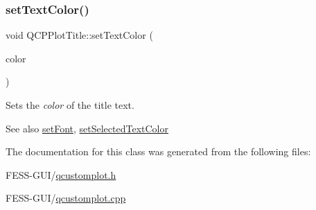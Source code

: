 \subsubsection{\texorpdfstring{set\+Text\+Color()}{setTextColor()}}
{\footnotesize\ttfamily void Q\+C\+P\+Plot\+Title\+::set\+Text\+Color (\begin{DoxyParamCaption}\item[{const Q\+Color \&}]{color }\end{DoxyParamCaption})}

Sets the {\itshape color} of the title text.

\begin{DoxySeeAlso}{See also}
\hyperlink{class_q_c_p_plot_title_a199fc7170802ea65006c371875349e37}{set\+Font}, \hyperlink{class_q_c_p_plot_title_a09ffd8c52ac8824d00382f84be391b66}{set\+Selected\+Text\+Color} 
\end{DoxySeeAlso}


The documentation for this class was generated from the following files\+:\begin{DoxyCompactItemize}
\item 
F\+E\+S\+S-\/\+G\+U\+I/\hyperlink{qcustomplot_8h}{qcustomplot.\+h}\item 
F\+E\+S\+S-\/\+G\+U\+I/\hyperlink{qcustomplot_8cpp}{qcustomplot.\+cpp}\end{DoxyCompactItemize}
